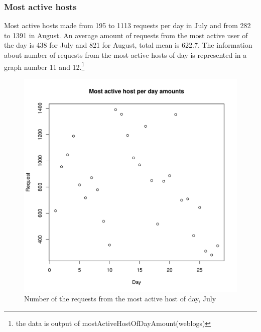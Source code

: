 \documentclass[english]{article}
\begin{document}
\subsubsection{Most active hosts}
Most active hosts made from 195 to 1113 requests per day in July and from 282 to 1391 in August. An average amount of requests from the most active user of the day is  438 for July and 821 for August, total mean is 622.7. The information about number of requests from the most active hosts of day is represented in a graph number 11 and 12.\footnote{the data is output of mostActiveHostOfDayAmount(weblogs)}
\begin{figure}[H]
\centerline{\includegraphics{Weblogs/Jul/MostActiveHostPerDayAmounts.pdf}}
\caption{Number of the requests from the most active host of day, July}
\end{figure}
\end{document}

